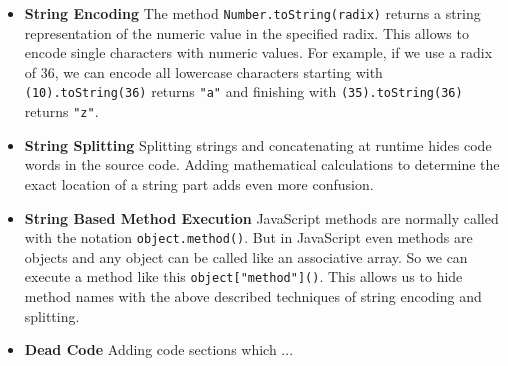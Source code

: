 			\begin{itemize}
				\item \textbf{String Encoding} The method \texttt{Number.toString(radix)} returns a string representation of the numeric value in the specified radix. This allows to encode single characters with numeric values. For example, if we use a radix of 36, we can encode all lowercase characters starting with \texttt{(10).toString(36)} returns \texttt{"a"} and finishing with \texttt{(35).toString(36)} returns \texttt{"z"}.
				\item \textbf{String Splitting} Splitting strings and concatenating at runtime hides code words in the source code. Adding mathematical calculations to determine the exact location of a string part adds even more confusion.
				\item \textbf{String Based Method Execution} JavaScript methods are normally called with the notation \texttt{object.method()}. But in JavaScript even methods are objects and any object can be called like an associative array. So we can execute a method like this \texttt{object["method"]()}. This allows us to hide method names with the above described techniques of string encoding and splitting. %
				\item \textbf{Dead Code} Adding code sections which ...
			\end{itemize}
			
